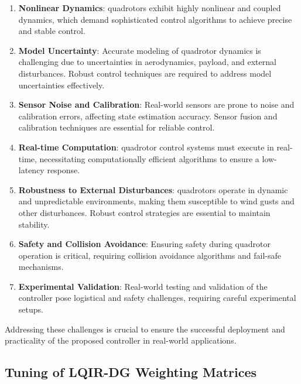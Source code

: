 \documentclass[3p]{elsarticle}
\begin{document}
\begin{enumerate}
  \item \textbf{Nonlinear Dynamics}: quadrotors exhibit highly nonlinear and coupled dynamics, which demand sophisticated control algorithms to achieve precise and stable control.

  \item \textbf{Model Uncertainty}: Accurate modeling of quadrotor dynamics is challenging due to uncertainties in aerodynamics, payload, and external disturbances. Robust control techniques are required to address model uncertainties effectively.

  \item \textbf{Sensor Noise and Calibration}: Real-world sensors are prone to noise and calibration errors, affecting state estimation accuracy. Sensor fusion and calibration techniques are essential for reliable control.

  \item \textbf{Real-time Computation}: quadrotor control systems must execute in real-time, necessitating computationally efficient algorithms to ensure a low-latency response.

  \item \textbf{Robustness to External Disturbances}: quadrotors operate in dynamic and unpredictable environments, making them susceptible to wind gusts and other disturbances. Robust control strategies are essential to maintain stability.

  \item \textbf{Safety and Collision Avoidance}: Ensuring safety during quadrotor operation is critical, requiring collision avoidance algorithms and fail-safe mechanisms.

  \item \textbf{Experimental Validation}: Real-world testing and validation of the controller pose logistical and safety challenges, requiring careful experimental setups.

\end{enumerate}

Addressing these challenges is crucial to ensure the successful deployment and practicality of the proposed controller in real-world applications.

\subsection{Tuning of LQIR-DG Weighting Matrices}
\end{document}
